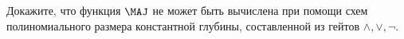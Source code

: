 Докажите, что функция $\MAJ$ не может быть вычислена при помощи схем полиномиального размера константной
глубины, составленной из гейтов $\land, \lor, \neg$.
